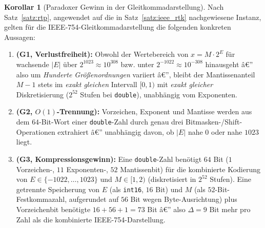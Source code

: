 ﻿\documentclass[a4paper,12pt]{article}
\theoremstyle{definition}
\newtheorem{korollar}{Korollar}
\begin{document}
\begin{korollar}[Paradoxer Gewinn in der Gleitkommadarstellung]
\label{kor:floatparadox}
	Nach Satz~\ref{satz:rtp}, angewendet auf die in
	Satz~\ref{satz:ieee_rtk} nachgewiesene Instanz, gelten für die
	IEEE-754-Gleitkommadarstellung die folgenden konkreten Aussagen:
	\begin{enumerate}[label=(F\arabic*)]
		\item \textbf{(G1, Verlustfreiheit):} Obwohl der Wertebereich von
		      $x=M\cdot2^E$ für wachsende $|E|$ über $2^{1023}\approx10^{308}$
		      bzw. unter $2^{-1022}\approx10^{-308}$ hinausgeht â€” also um
		      \emph{Hunderte Größenordnungen} variiert â€”, bleibt der
		      Mantissenanteil $M-1$ stets im \emph{exakt gleichen} Intervall
		      $[0,1)$ mit \emph{exakt gleicher} Diskretisierung
		      ($2^{52}$ Stufen bei \texttt{double}), unabhängig vom Exponenten.
		\item \textbf{(G2, $O(1)$-Trennung):} Vorzeichen, Exponent und
		      Mantisse werden aus dem $64$-Bit-Wort einer
		      \texttt{double}-Zahl durch genau drei
		      Bitmasken-/Shift-Operationen extrahiert â€” unabhängig davon, ob
		      $|E|$ nahe $0$ oder nahe $1023$ liegt.
		\item \textbf{(G3, Kompressionsgewinn):} Eine \texttt{double}-Zahl
		      benötigt $64$ Bit ($1$ Vorzeichen-, $11$ Exponenten-, $52$
		      Mantissenbit) für die kombinierte Kodierung von $E\in\{-1022,\ldots,1023\}$
		      und $M\in[1,2)$ (diskretisiert in $2^{52}$ Stufen). Eine
		      getrennte Speicherung von $E$ (als \texttt{int16}, $16$ Bit)
		      und $M$ (als $52$-Bit-Festkommazahl, aufgerundet auf $56$ Bit
		      wegen Byte-Ausrichtung) plus Vorzeichenbit benötigte
		      $16+56+1=73$ Bit â€” also $\Delta=9$ Bit mehr pro Zahl als die
		      kombinierte IEEE-754-Darstellung.
	\end{enumerate}
\end{korollar}
\end{document}
